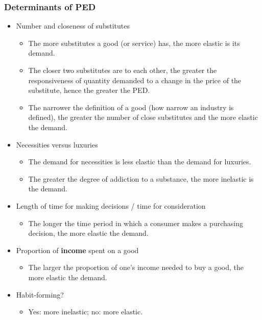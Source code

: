 \documentclass[a4paper,12pt]{article}
\begin{document}
\subsubsection*{Determinants of PED}
\begin{itemize}
  \item Number and closeness of substitutes
  \begin{itemize}
    \item The more substitutes a good (or service) has, the more elastic is its demand.
    \item The closer two substitutes are to each other, the greater the responsiveness of quantity demanded to a change in the price of the substitute, hence the greater the PED.
    \item The narrower the definition of a good (how narrow an industry is defined), the greater the number of close substitutes and the more elastic the demand.
  \end{itemize}
  \item Necessities versus luxuries
  \begin{itemize}
    \item The demand for necessities is less elastic than the demand for luxuries.
    \item The greater the degree of addiction to a substance, the more inelastic is the demand. 
  \end{itemize}
  \item Length of time for making decisions / time for consideration
  \begin{itemize}
    \item The longer the time period in which a consumer makes a purchasing decision, the more elastic the demand.
  \end{itemize}
  \item Proportion of \textbf{income} spent on a good
  \begin{itemize}
    \item The larger the proportion of one's income needed to buy a good, the more elastic the demand.
  \end{itemize}
	\item Habit-forming?
	\begin{itemize}
	    \item Yes: more inelastic; no: more elastic.
	\end{itemize}
\end{itemize}
\end{document}
